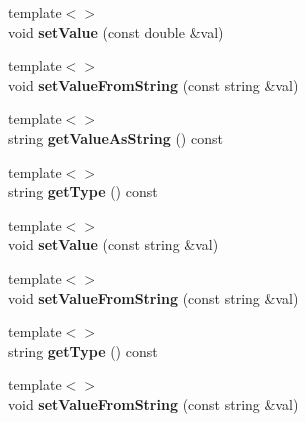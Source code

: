 \begin{DoxyCompactItemize}
\item 
\hypertarget{classrrp_1_1_parameter_a28ad31c043957d895a9969589c857c47}{{\footnotesize template$<$$>$ }\\void {\bfseries set\-Value} (const double \&val)}\label{classrrp_1_1_parameter_a28ad31c043957d895a9969589c857c47}

\item 
\hypertarget{classrrp_1_1_parameter_a1621a0f9b6cd7c6973f1a660622becf7}{{\footnotesize template$<$$>$ }\\void {\bfseries set\-Value\-From\-String} (const string \&val)}\label{classrrp_1_1_parameter_a1621a0f9b6cd7c6973f1a660622becf7}

\item 
\hypertarget{classrrp_1_1_parameter_a2f3b3ce7dbe0f955aa7c177637f9fbb0}{{\footnotesize template$<$$>$ }\\string {\bfseries get\-Value\-As\-String} () const}\label{classrrp_1_1_parameter_a2f3b3ce7dbe0f955aa7c177637f9fbb0}

\item 
\hypertarget{classrrp_1_1_parameter_a49aebd913ae26cd0a3c2cce3c758171e}{{\footnotesize template$<$$>$ }\\string {\bfseries get\-Type} () const}\label{classrrp_1_1_parameter_a49aebd913ae26cd0a3c2cce3c758171e}

\item 
\hypertarget{classrrp_1_1_parameter_a100a062d140b2124c118f0d739f728d8}{{\footnotesize template$<$$>$ }\\void {\bfseries set\-Value} (const string \&val)}\label{classrrp_1_1_parameter_a100a062d140b2124c118f0d739f728d8}

\item 
\hypertarget{classrrp_1_1_parameter_a1621a0f9b6cd7c6973f1a660622becf7}{{\footnotesize template$<$$>$ }\\void {\bfseries set\-Value\-From\-String} (const string \&val)}\label{classrrp_1_1_parameter_a1621a0f9b6cd7c6973f1a660622becf7}

\item 
\hypertarget{classrrp_1_1_parameter_a49aebd913ae26cd0a3c2cce3c758171e}{{\footnotesize template$<$$>$ }\\string {\bfseries get\-Type} () const}\label{classrrp_1_1_parameter_a49aebd913ae26cd0a3c2cce3c758171e}

\item 
\hypertarget{classrrp_1_1_parameter_a1621a0f9b6cd7c6973f1a660622becf7}{{\footnotesize template$<$$>$ }\\void {\bfseries set\-Value\-From\-String} (const string \&val)}\label{classrrp_1_1_parameter_a1621a0f9b6cd7c6973f1a660622becf7}


\end{DoxyCompactItemize}
